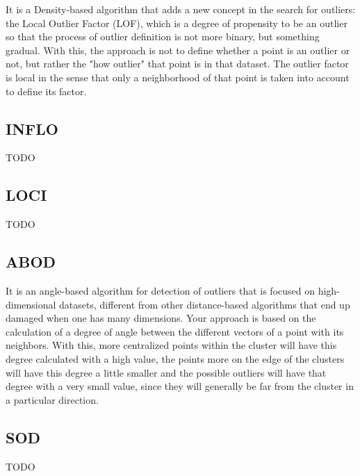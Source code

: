 It is a Density-based algorithm that adds a new concept in the search for outliers: the
Local Outlier Factor (LOF), which is a degree of propensity to be an outlier so that the
process of outlier definition is not more binary, but something gradual. With this, the
approach is not to define whether a point is an outlier or not, but rather the "how outlier"
that point is in that dataset. The outlier factor is local in the sense that only a neighborhood
of that point is taken into account to define its factor.

\subsection{INFLO}

TODO

\subsection{LOCI}

TODO

\subsection{ABOD}

It is an angle-based algorithm for detection of outliers that is focused on high-dimensional
datasets, different from other distance-based algorithms that end up damaged when one has
many dimensions. Your approach is based on the calculation of a degree of angle between the
different vectors of a point with its neighbors. With this, more centralized points within
the cluster will have this degree calculated with a high value, the points more on the edge
of the clusters will have this degree a little smaller and the possible outliers will have
that degree with a very small value, since they will generally be far from the cluster in a
particular direction.

\subsection{SOD}

TODO